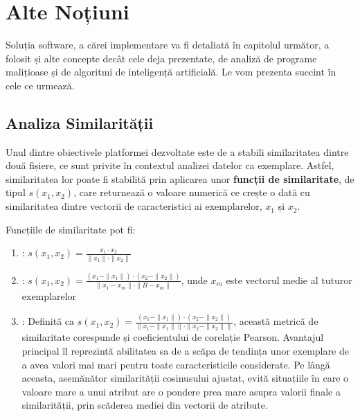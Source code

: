 \documentclass[../../main.tex]{subfiles}
\begin{document}
\section{Alte Noțiuni}
\label{sec:theory_misc}

Soluția software, a cărei implementare va fi detaliată în capitolul următor, a folosit și alte concepte decât cele deja prezentate, de analiză de programe malițioase și de algoritmi de inteligență artificială. Le vom prezenta succint în cele ce urmează.

\subsection{Analiza Similarității}

Unul dintre obiectivele platformei dezvoltate este de a stabili similaritatea dintre două fișiere, ce sunt privite în contextul analizei datelor ca exemplare. Astfel, similaritatea lor poate fi stabilită prin aplicarea unor \textbf{funcții de similaritate}, de tipul $ s(x_1, x_2) $, care returnează o valoare numerică ce crește o dată cu similaritatea dintre vectorii de caracteristici ai exemplarelor, $ x_1 $ și $ x_2 $.

Funcțiile de similaritate pot fi:

\begin{enumerate}
    \item {}: $ s(x_1, x_2) = \frac{x_1 \cdot x_2}{\parallel x_1 \parallel \cdot \parallel x_2 \parallel} $
    \item {}: $ s(x_1, x_2) = \frac{(x_1 - \parallel x_1 \parallel) \cdot (x_2 - \parallel x_2 \parallel)}{\parallel x_1 - x_m \parallel \cdot \parallel B - x_m \parallel} $, unde $ x_m $ este vectorul medie al tuturor exemplarelor
    \item {}: Definită ca $ s(x_1, x_2) = \frac{(x_1 - \parallel x_1 \parallel) \cdot (x_2 - \parallel x_2 \parallel)}{\parallel x_1 - \parallel x_1 \parallel \parallel \cdot \parallel x_2 - \parallel x_2 \parallel \parallel} $, această metrică de similaritate corespunde și coeficientului de corelație Pearson. Avantajul principal îl reprezintă abilitatea sa de a scăpa de tendința unor exemplare de a avea valori mai mari pentru toate caracteristicile considerate. Pe lângă aceasta, asemănător similarității cosinusului ajustat, evită situațiile în care o valoare mare a unui atribut are o pondere prea mare asupra valorii finale a similarității, prin scăderea mediei din vectorii de atribute.
\end{enumerate}
\end{document}
